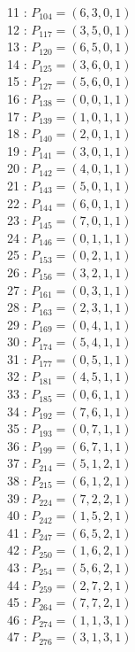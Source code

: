 \documentclass{article}
\begin{document}
{\begin{multicols}{3}
11 : $P_{104}=( 6, 3, 0, 1 )$\\
12 : $P_{117}=( 3, 5, 0, 1 )$\\
13 : $P_{120}=( 6, 5, 0, 1 )$\\
14 : $P_{125}=( 3, 6, 0, 1 )$\\
15 : $P_{127}=( 5, 6, 0, 1 )$\\
16 : $P_{138}=( 0, 0, 1, 1 )$\\
17 : $P_{139}=( 1, 0, 1, 1 )$\\
18 : $P_{140}=( 2, 0, 1, 1 )$\\
19 : $P_{141}=( 3, 0, 1, 1 )$\\
20 : $P_{142}=( 4, 0, 1, 1 )$\\
21 : $P_{143}=( 5, 0, 1, 1 )$\\
22 : $P_{144}=( 6, 0, 1, 1 )$\\
23 : $P_{145}=( 7, 0, 1, 1 )$\\
24 : $P_{146}=( 0, 1, 1, 1 )$\\
25 : $P_{153}=( 0, 2, 1, 1 )$\\
26 : $P_{156}=( 3, 2, 1, 1 )$\\
27 : $P_{161}=( 0, 3, 1, 1 )$\\
28 : $P_{163}=( 2, 3, 1, 1 )$\\
29 : $P_{169}=( 0, 4, 1, 1 )$\\
30 : $P_{174}=( 5, 4, 1, 1 )$\\
31 : $P_{177}=( 0, 5, 1, 1 )$\\
32 : $P_{181}=( 4, 5, 1, 1 )$\\
33 : $P_{185}=( 0, 6, 1, 1 )$\\
34 : $P_{192}=( 7, 6, 1, 1 )$\\
35 : $P_{193}=( 0, 7, 1, 1 )$\\
36 : $P_{199}=( 6, 7, 1, 1 )$\\
37 : $P_{214}=( 5, 1, 2, 1 )$\\
38 : $P_{215}=( 6, 1, 2, 1 )$\\
39 : $P_{224}=( 7, 2, 2, 1 )$\\
40 : $P_{242}=( 1, 5, 2, 1 )$\\
41 : $P_{247}=( 6, 5, 2, 1 )$\\
42 : $P_{250}=( 1, 6, 2, 1 )$\\
43 : $P_{254}=( 5, 6, 2, 1 )$\\
44 : $P_{259}=( 2, 7, 2, 1 )$\\
45 : $P_{264}=( 7, 7, 2, 1 )$\\
46 : $P_{274}=( 1, 1, 3, 1 )$\\
47 : $P_{276}=( 3, 1, 3, 1 )$\\

\end{multicols}}
\end{document}
